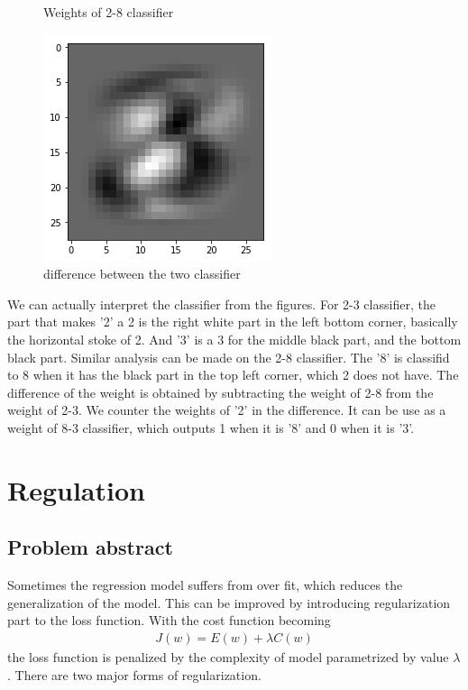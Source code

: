 \documentclass{article}
\begin{document}
\begin{figure}[h]
\begin{minipage}{0.3\textwidth}
		\caption{Weights of 2-8 classifier}
	\end{minipage}\hfill
	\begin{minipage}{0.3\textwidth}
		\centering
		\includegraphics[width=\textwidth]{pics/3_8.png}
		\caption{difference between the two classifier}
	\end{minipage}
\end{figure}
We can actually interpret the classifier from the figures. For 2-3 classifier, the part that makes '2' a 2 is the right white part in the left bottom corner, basically the horizontal stoke of 2. And '3' is a 3 for the middle black part, and the bottom black part. Similar analysis can be made on the 2-8 classifier. The '8' is classifid to 8 when it has the black part in the top left corner, which 2 does not have. The difference of the weight is obtained by subtracting the weight of 2-8 from the weight of 2-3. We counter the weights of '2' in the difference. It can be use as a weight of 8-3 classifier, which outputs 1 when it is '8' and 0 when it is '3'. 
\newpage
\section{Regulation}
\subsection{Problem abstract}
Sometimes the regression model suffers from over fit, which reduces the generalization of the model. This can be improved by introducing regularization part to the loss function. With the cost function becoming \begin{align*}
J(w) = E(w) + \lambda C(w)
\end{align*}
 the loss function is penalized by the complexity of model parametrized by value $\lambda$. There are two major forms of regularization. 
 
\end{document}
